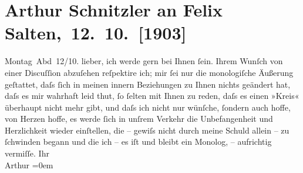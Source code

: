 

         
         \renewcommand{\erwaehntePersonen}{Personen: Felix Salten}
         \renewcommand{\erwaehnteOrte}{Orte: Wien}
         \renewcommand{\erwaehnteWerke}{}
               \section[ Arthur Schnitzler an Felix Salten, 12. 10. {[}1903{]}]{ Arthur Schnitzler an Felix Salten, 12. 10. {[}1903{]}}\nopagebreak{}\rehead{ }\begin{ledgroupsized}[t]{13cm}\normalsize\beginnumbering \toendnotes[C]{\smallbreak\pagebreak[2]} 
\toendnotes[C]{\smallbreak}\pstart
           \raggedleft{}{\pb}Montag Abd 12/10.\pend
           \pstart
           lieber, ich werde \label{K_L02984-1v}\label{K_L02984-1h} gern bei Ihnen ſein. Ihrem Wunſch von einer Discuſſion abzuſehen reſpektire
               ich; mir ſei nur die monologiſche Äußerung geſtattet, daſs ſich in meinen innern
               Beziehungen zu Ihnen nichts geändert hat, daſs es mir wahrhaft leid thut, ſo ſelten
               mit Ihnen zu reden, daſs es {\pb}einen »Kreis«
               überhaupt nicht mehr gibt, und daſs ich nicht nur wünſche, ſondern auch hoffe,  von Herzen hoffe, es werde ſich in unſrem Verkehr
               die Unbefangenheit und Herzlichkeit wieder einſtellen, die – gewiſs nicht durch meine
               Schuld allein – zu ſchwinden begann und die ich – es iſt {\pb}und bleibt ein Monolog, – aufrichtig
               vermiſſe.\pend
           \pstart
           Ihr {\\[\baselineskip]}\spacefill\mbox{Arthur}\pend
           \leftskip=0em{}
         
         \endnumbering{}\end{ledgroupsized}  \newcommand{\dateiname}{L02984}\newcommand{\titel}{Arthur Schnitzler an Felix Salten, 12. 10. [1903]}\newcommand{\editorInnen}{Martin Anton Müller und Laura Untner}
      